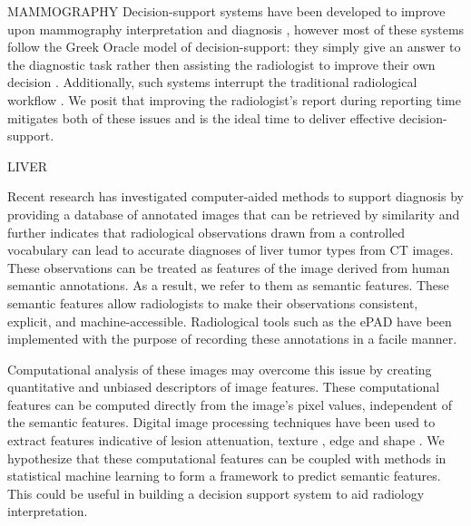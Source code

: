 MAMMOGRAPHY
Decision-support systems have been developed to improve upon mammography interpretation and diagnosis \cite{Garg:2005cb, Burnside:2000wl, ElizabethS:2005gc, Rubin:2005jg}, however most of these systems follow the Greek Oracle model of decision-support: they simply give an answer to the diagnostic task rather then assisting the radiologist to improve their own decision \cite{Miller:1990wg, Friedman:2009dx}. Additionally, such systems interrupt the traditional radiological workflow \cite{Morgan:2011ct}. We posit that improving the radiologist’s report during reporting time mitigates both of these issues and is the ideal time to deliver effective decision-support.

LIVER

Recent research has investigated computer-aided methods to support diagnosis by providing a database of annotated images that can be retrieved by similarity\cite{Napel:2010es} and further indicates that radiological observations drawn from a controlled vocabulary can lead to accurate diagnoses of liver tumor types from CT images\cite{Korenblum:2011gx}. These observations can be treated as features of the image derived from human semantic annotations. As a result, we refer to them as semantic features. These semantic features allow radiologists to make their observations consistent, explicit, and machine-accessible. Radiological tools such as the ePAD \cite{Rubin:2008uz} have been implemented with the purpose of recording these annotations in a facile manner.

Computational analysis of these images may overcome this issue by creating quantitative and unbiased descriptors of image features. These computational features can be computed directly from the image's pixel values, independent of the semantic features. Digital image processing techniques have been used to extract features indicative of lesion attenuation, texture \cite{Strela:2002vq,Zhao:2005wb}, edge and shape \cite{Hong:2006ti,Manay:2006un,MRangayyan:2005td,Xu:2012bh}. We hypothesize that these computational features can be coupled with methods in statistical machine learning to form a framework to predict semantic features. This could be useful in building a decision support system to aid radiology interpretation.